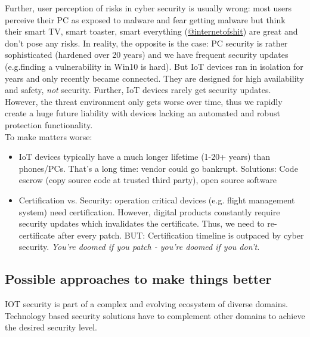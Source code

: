 \documentclass[11pt,oneside,a4paper]{article}
\begin{document}
\noindent Further, user perception of risks in cyber security is usually wrong: most users perceive their PC as exposed to malware and fear getting malware but think their smart TV, smart toaster, smart everything (\href{https://twitter.com/internetofshit}{@internetofshit}) are great and don't pose any risks. In reality, the opposite is the case: PC security is rather sophisticated (hardened over 20 years) and we have frequent security updates (e.g.finding a vulnerability in Win10 is hard). But IoT devices ran in isolation for years and only recently became connected. They are designed for high availability and safety, \textit{not} security. Further, IoT devices rarely get security updates. However, the threat environment only gets worse over time, thus we rapidly create a huge future liability with devices lacking an automated and robust protection functionality.\\
To make matters worse:

\vspace{-\topsep}
\begin{itemize}
	\setlength{\itemsep}{0pt}
	\setlength{\parskip}{0pt}
	\item IoT devices typically have a much longer lifetime (1-20+ years) than phones/PCs. That's a long time: vendor could go bankrupt. Solutions: Code escrow (copy source code at trusted third party), open source software
	\item Certification vs. Security: operation critical devices (e.g. flight management system) need certification. However, digital products constantly require security updates which invalidates the certificate. Thus, we need to re-certificate after every patch. BUT: Certification timeline is outpaced by cyber security.
	\subitem \textit{You're doomed if you patch - you're doomed if you don't.}
\end{itemize}
\vspace{-\topsep}

\subsection{Possible approaches to make things better}

IOT security is part of a complex and evolving ecosystem of diverse domains. Technology based security solutions have to complement other domains to achieve the desired security level.
\end{document}

